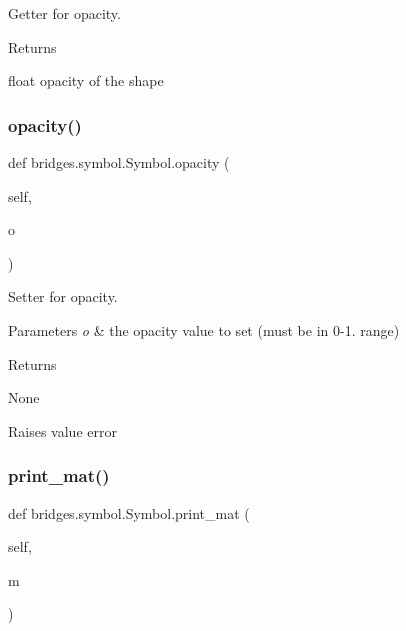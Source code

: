 Getter for opacity. 

\begin{DoxyReturn}{Returns}


float opacity of the shape 
\end{DoxyReturn}
\mbox{\label{classbridges_1_1symbol_1_1_symbol_afea86f6d7c341168810c09159780ea83}} 
\subsubsection{\texorpdfstring{opacity()}{opacity()}\hspace{0.1cm}{\footnotesize\ttfamily [2/2]}}
{\footnotesize\ttfamily def bridges.\+symbol.\+Symbol.\+opacity (\begin{DoxyParamCaption}\item[{}]{self,  }\item[{}]{o }\end{DoxyParamCaption})}



Setter for opacity. 


\begin{DoxyParams}{Parameters}
{\em o} & the opacity value to set (must be in 0-\/1. range) \\
\hline
\end{DoxyParams}
\begin{DoxyReturn}{Returns}


None 

Raises value error 
\end{DoxyReturn}
\mbox{\label{classbridges_1_1symbol_1_1_symbol_af84e3be732b683c923a595a5a7a3a2b1}} 
\subsubsection{\texorpdfstring{print\+\_\+mat()}{print\_mat()}}
{\footnotesize\ttfamily def bridges.\+symbol.\+Symbol.\+print\+\_\+mat (\begin{DoxyParamCaption}\item[{}]{self,  }\item[{}]{m }\end{DoxyParamCaption})}


